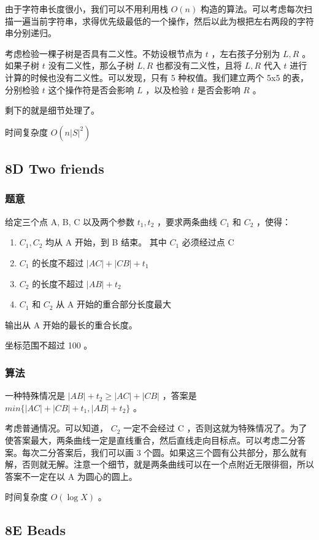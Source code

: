 \documentclass[11pt]{article}
\begin{document}
    由于字符串长度很小，我们可以不用利用栈 $O(n)$ 构造的算法。可以考虑每次扫描一遍当前字符串，求得优先级最低的一个操作，然后以此为根把左右两段的字符串分别递归。
    
    考虑检验一棵子树是否具有二义性。不妨设根节点为 $t$ ，左右孩子分别为 $L, R$ 。如果子树 $t$ 没有二义性，那么子树 $L, R$ 也都没有二义性，且将 $L, R$ 代入 $t$ 进行计算的时候也没有二义性。可以发现，只有 5 种权值。我们建立两个 5x5 的表，分别检验 $t$ 这个操作符是否会影响 $L$ ，以及检验 $t$ 是否会影响 $R$ 。

    剩下的就是细节处理了。

    时间复杂度 $O(n |S|^2)$
\subsection{8D    Two friends}
\label{sec-1-2}
\subsubsection{题意}
\label{sec-1-2-1}

    给定三个点 A, B, C 以及两个参数 $t_1, t_2$ ，要求两条曲线 $C_1$ 和 $C_2$ ，使得：
\begin{enumerate}
\item $C_1, C_2$ 均从 A 开始，到 B 结束。 其中 $C_1$ 必须经过点 C
\item $C_1$ 的长度不超过 $|AC| + |CB| + t_1$
\item $C_2$ 的长度不超过 $|AB| + t_2$
\item $C_1$ 和 $C_2$ 从 A 开始的重合部分长度最大
\end{enumerate}

   输出从 A 开始的最长的重合长度。

   坐标范围不超过 100 。
\subsubsection{算法}
\label{sec-1-2-2}

    一种特殊情况是 $|AB| + t_2 \geq |AC| + |CB|$ ，答案是 $min\{ |AC| + |CB| + t_1, |AB| + t_2\}$ 。

    考虑普通情况。可以知道， $C_2$ 一定不会经过 C ，否则这就为特殊情况了。为了使答案最大，两条曲线一定是直线重合，然后直线走向目标点。可以考虑二分答案。每次二分答案后，我们可以画 3 个圆。如果这三个圆有公共部分，那么就有解，否则就无解。注意一个细节，就是两条曲线可以在一个点附近无限徘徊，所以答案不一定在以 A 为圆心的圆上。
    
    时间复杂度 $O(\log X)$ 。
\subsection{8E    Beads}
\label{sec-1-3}
\end{document}
